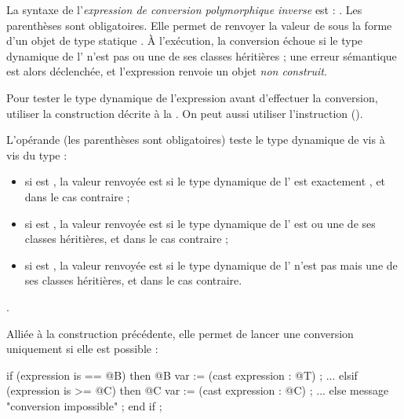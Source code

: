 La syntaxe de l'\emph{expression de conversion polymorphique inverse} est : . Les parenthèses sont obligatoires. Elle permet de renvoyer la valeur de  sous la forme d'un objet de type statique . À l'exécution, la conversion échoue si le type dynamique de l' n'est pas  ou une de ses classes héritières ; une erreur sémantique est alors déclenchée, et l'expression renvoie un objet \emph{non construit}.

Pour tester le type dynamique de l'expression avant d'effectuer la conversion, utiliser la construction décrite à la . On peut aussi utiliser l'instruction  ().








L'opérande  (les parenthèses sont obligatoires) teste le type dynamique de  vis à vis du type  :
\begin{itemize}
\item si  est \galgas{==}, la valeur renvoyée est  si le type dynamique de l' est exactement , et  dans le cas contraire ;
\item si  est \galgas{>=}, la valeur renvoyée est  si le type dynamique de l' est  ou une de ses classes héritières, et  dans le cas contraire ;
\item si  est \galgas{>}, la valeur renvoyée est  si le type dynamique de l' n'est pas  mais une de ses classes héritières, et  dans le cas contraire.
\end{itemize}


.

Alliée à la construction précédente, elle permet de lancer une conversion uniquement si elle est possible :

\begin{galgascode}
if (expression is == @B) then
  @B var := (cast expression : @T) ;
  ...
elsif (expression is >= @C) then
  @C var := (cast expression : @C) ;
  ...
else
  message "conversion impossible" ;
end if ;
\end{galgascode}


